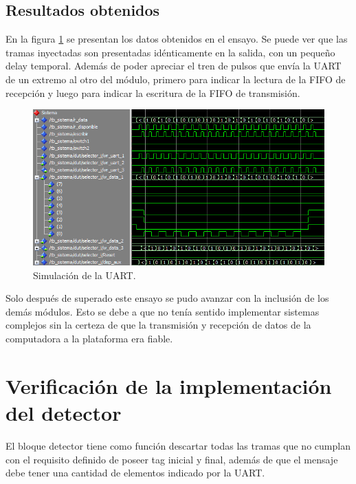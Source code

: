 	\subsection{Resultados obtenidos}
				
		En la figura \ref{fig:Test_UART} se presentan los datos obtenidos en el ensayo. Se puede ver que las tramas inyectadas son presentadas idénticamente en la salida, con un pequeño delay temporal. Además de poder apreciar el tren de pulsos que envía la UART de un extremo al otro del módulo, primero para indicar la lectura de la FIFO de recepción y luego para indicar la escritura de la FIFO de transmisión.
		
		\begin{figure}[h]
		\centering
		\includegraphics[scale=0.7]{./Figures/Test/UART}
			\caption{Simulación de la UART.}
			\label{fig:Test_UART}
		\end{figure}
			
		Solo después de superado este ensayo se pudo avanzar con la inclusión de los demás módulos. Esto se debe a que no tenía sentido implementar sistemas complejos sin la certeza de que la transmisión y recepción de datos de la computadora a la plataforma era fiable. %
	
\section{Verificación de la implementación del detector}

	El bloque detector tiene como función descartar todas las tramas que no cumplan con el requisito definido de poseer tag inicial y final, además de que el mensaje debe tener una cantidad de elementos indicado por la UART.
	
